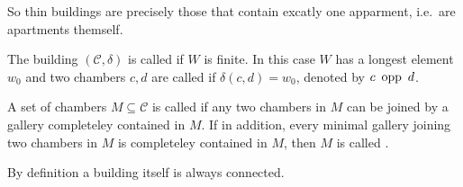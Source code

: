 So thin buildings are precisely those that contain excatly one apparment, i.e.\ are apartments themself.

\begin{defi}
	The building $(\mathcal{C},\delta)$ is called  if $W$ is finite. In this case $W$ has a longest element $w_0$ and two chambers $c,d$ are called  if $\delta(c,d) = w_0$, denoted by $c \opp d$.
\end{defi}

\begin{defi}
	A set of chambers $M \subseteq \mathcal{C}$ is called  if any two chambers in $M$ can be joined by a gallery completeley contained in $M$. If in addition, every minimal gallery joining two chambers in $M$ is completeley contained in $M$, then $M$ is called .
\end{defi}

\begin{rema}
	By definition a building itself is always connected.
\end{rema}